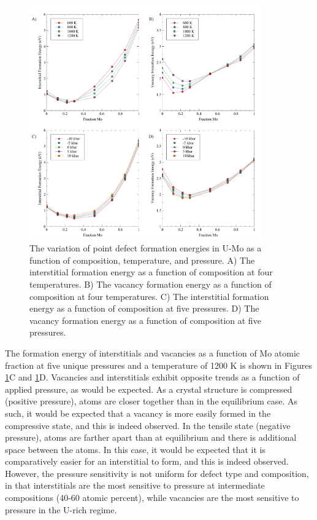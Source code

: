 \documentclass[review]{elsarticle}
\begin{document}
\begin{figure}[h!]
\centering
\includegraphics[width=0.9\textwidth]{figA.pdf}
\caption{The variation of point defect formation energies in U-Mo as a function of composition, temperature, and pressure. A) The interstitial formation energy as a function of composition at four temperatures. B) The vacancy formation energy as a function of composition at four temperatures. C) The interstitial formation energy as a function of composition at five pressures. D) The vacancy formation energy as a function of composition at five pressures.} 
\label{fig:A}
\end{figure}

The formation energy of interstitials and vacancies as a function of Mo atomic fraction at five unique pressures and a temperature of 1200 K is shown in Figures \ref{fig:A}C and \ref{fig:A}D. Vacancies and interstitials exhibit opposite trends as a function of applied pressure, as would be expected. As a crystal structure is compressed (positive pressure), atoms are closer together than in the equilibrium case. As such, it would be expected that a vacancy is more easily formed in the compressive state, and this is indeed observed. In the tensile state (negative pressure), atoms are farther apart than at equilibrium and there is additional space between the atoms. In this case, it would be expected that it is comparatively easier for an interstitial to form, and this is indeed observed. However, the pressure sensitivity is not uniform for defect type and composition, in that interstitials are the most sensitive to pressure at intermediate compositions (40-60 atomic percent), while vacancies are the most sensitive to pressure in the U-rich regime. 
\end{document}
